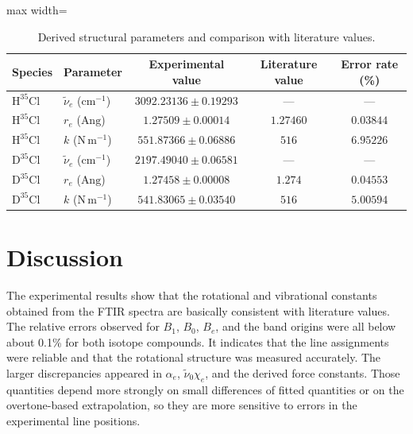 \documentclass[12pt]{article}
\begin{document}
\begin{table}[htbp]
\centering
\small
\caption{Derived structural parameters and comparison with literature values.}
\label{tab:derived_parameters}
\begin{adjustbox}{max width=\linewidth}
\begin{tabular}{llccc}
\toprule
Species & Parameter & Experimental value & Literature value\cite{sime1990lit_all,herzberg2013bond_lit,lide2002constant_lit} & Error rate (\%) \\
\midrule
\(\mathrm{H}^{35}\mathrm{Cl}\) & \(\tilde{\nu}_e\) (\(\mathrm{cm}^{-1}\)) & \(3092.23136 \pm 0.19293\) & --- & --- \\
\(\mathrm{H}^{35}\mathrm{Cl}\) & \(r_e\) (\(\text{Ang}\))& \(1.27509 \pm 0.00014\) & \(1.27460\) & \(0.03844\) \\
\(\mathrm{H}^{35}\mathrm{Cl}\) & \(k\) (\(\mathrm{N\,m^{-1}}\)) & \(551.87366 \pm 0.06886\)& \(516\) & \(6.95226\)\\
\(\mathrm{D}^{35}\mathrm{Cl}\) & \(\tilde{\nu}_e\) (\(\mathrm{cm}^{-1}\)) & \(2197.49040 \pm 0.06581\) & --- & --- \\
\(\mathrm{D}^{35}\mathrm{Cl}\) & \(r_e\) (\(\text{Ang}\))& \(1.27458 \pm 0.00008\) & \(1.274\) & \(0.04553\) \\
\(\mathrm{D}^{35}\mathrm{Cl}\) & \(k\) (\(\mathrm{N\,m^{-1}}\)) & \(541.83065 \pm 0.03540\)& \(516\) & \(5.00594\)\\
\bottomrule
\end{tabular}
\end{adjustbox}
\end{table}

\newpage
\section*{Discussion}
The experimental results show that the rotational and vibrational constants obtained from the FTIR spectra are basically consistent with literature values\cite{lide2002constant_lit,herzberg2013bond_lit,sime1990lit_all}. The relative errors observed for \(B_1\), \(B_0\), \(B_e\), and the band origins were all below about 0.1\% for both isotope compounds. It indicates that the line assignments were reliable and that the rotational structure was measured accurately. The larger discrepancies appeared in \(\alpha_e\), \(\tilde{\nu}_0\chi_e\), and the derived force constants. Those quantities depend more strongly on small differences of fitted quantities or on the overtone-based extrapolation, so they are more sensitive to errors in the experimental line positions.
\end{document}
